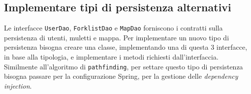 \subsection{Implementare tipi di persistenza alternativi}
Le interfacce \texttt{UserDao}, \texttt{ForklistDao} e \texttt{MapDao} forniscono i contratti sulla persistenza di utenti, muletti e mappa. Per implementare un nuovo tipo di persistenza bisogna creare una classe, implementando una di questa 3 interfacce, in base alla tipologia, e implementare i metodi richiesti dall'interfaccia.
Similmente all'algoritmo di \texttt{pathfinding}, per settare questo tipo di persistenza bisogna passare per la configurazione Spring, per la gestione delle \textit{dependency injection}.